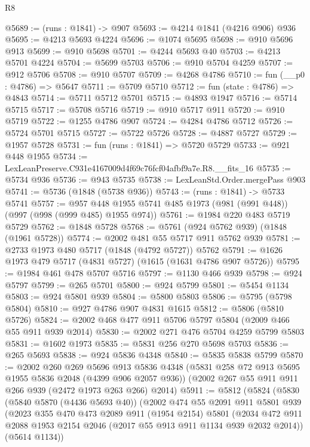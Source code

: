 \begin{lexlean}{R8}
\begin{coremodule}
@5689 := (runs : @1841) -> @907
@5693 := @4214 @1841 (@4216 @906) @936
@5695 := @4213 @5693 @4224
@5696 := @1074 @5695
@5698 := @910 @5696 @913
@5699 := @910 @5698
@5701 := @4244 @5693 @40
@5703 := @4213 @5701 @4224
@5704 := @5699 @5703
@5706 := @910 @5704 @4259
@5707 := @912 @5706
@5708 := @910 @5707
@5709 := @4268 @4786
@5710 := fun (__p0 : @4786) => @5647
@5711 := @5709 @5710
@5712 := fun (state : @4786) => @4843
@5714 := @5711 @5712 @5701
@5715 := @4893 @1947
@5716 := @5714 @5715
@5717 := @5708 @5716
@5719 := @910 @5717 @911
@5720 := @910 @5719
@5722 := @1255 @4786 @907
@5724 := @4284 @4786 @5712
@5726 := @5724 @5701 @5715
@5727 := @5722 @5726
@5728 := @4887 @5727
@5729 := @1957 @5728
@5731 := fun (runs : @1841) => @5720 @5729
@5733 := @921 @448 @1955
@5734 := LexLeanPreserve.C931e4167009d4f69c76fcf04afbf9a7e.R8.__fits_16
@5735 := @5734 @936
@5736 := @943 @5735
@5738 := LexLeanStd.Order.mergePass @903
@5741 := @5736 (@1848 (@5738 @936))
@5743 := (runs : @1841) -> @5733 @5741
@5757 := @957 @448 @1955 @5741 @485 @1973 (@981 (@991 @448)) (@997 (@998 (@999 @485) @1955 @974))
@5761 := @1984 @220 @483 @5719 @5729
@5762 := @1848 @5728
@5768 := @5761 (@924 @5762 @939) (@1848 (@1961 @5728))
@5774 := @2002 @481 @55 @5717 @911 @5762 @939
@5781 := @2733 @1973 @480 @5717 (@1848 (@4792 @5727)) @5762
@5791 := @1626 @1973 @479 @5717 (@4831 @5727) (@1615 (@1631 @4786 @907 @5726))
@5795 := @1984 @461 @478 @5707 @5716
@5797 := @1130 @466 @939
@5798 := @924 @5797
@5799 := @265 @5701
@5800 := @924 @5799
@5801 := @5454 @1134
@5803 := @924 @5801 @939
@5804 := @5800 @5803
@5806 := @5795 (@5798 @5804)
@5810 := @927 @4786 @907 @4831 @1615
@5812 := @5806 (@5810 @5726)
@5824 := @2002 @468 @477 @911 @5706 @5797 @5804 (@2009 @466 @55 @911 @939 @2014)
@5830 := @2002 @271 @476 @5704 @4259 @5799 @5803
@5831 := @1602 @1973
@5835 := @5831 @256 @270 @5698 @5703
@5836 := @265 @5693
@5838 := @924 @5836 @4348
@5840 := @5835 @5838 @5799
@5870 := @2002
    @260
    @269
    @5696
    @913
    @5836
    @4348
    (@5831 @258 @72 @913 @5695 @1955 @5836 @2048 (@4399 @906 @2057 @936))
    (@2002 @267 @55 @911 @911 @266 @939 (@2472 @1973 @263 @266) @2014)
@5911 := @5812
    (@5824
      (@5830
        (@5840 @5870 (@4436 @5693 @40))
        (@2002
          @474
          @55
          @2091
          @911
          @5801
          @939
          (@2023
            @355
            @470
            @473
            @2089
            @911
            (@1954 @2154)
            @5801
            (@2034 @472 @911 @2088 @1953 @2154 @2046 (@2017 @55 @913 @911 @1134 @939 @2032 @2014))
            (@5614 @1134))

\end{coremodule}
\end{lexlean}

